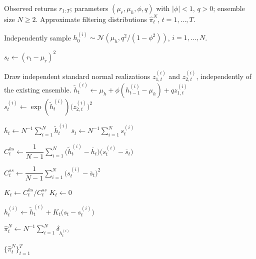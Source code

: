 \begin{algorithm}[htbp]
\caption{EnKF-Type Filtering for the SV Model Using Squared Returns}
\label{alg:sv-enkf}
\begin{algorithmic}[1]
\Require Observed returns $r_{1:T}$; parameters
$(\mu_r,\mu_h,\phi,q)$ with $|\phi|<1$, $q>0$;
ensemble size $N\geq 2$.
\Ensure Approximate filtering distributions
$\widehat{\pi}_t^N$, $t=1,\ldots,T$.

\State Independently sample
$h_0^{(i)}\sim
\mathcal{N}\!\left(\mu_h,q^2/(1-\phi^2)\right)$,
$i=1,\ldots,N$.

    \State $s_t\gets(r_t-\mu_r)^2$

        \State Draw independent standard normal realizations
        $z_{1,t}^{(i)}$ and $z_{2,t}^{(i)}$,
        independently of the existing ensemble.
        \State $\widetilde{h}_t^{(i)}
        \gets \mu_h+\phi(h_{t-1}^{(i)}-\mu_h)
        +qz_{1,t}^{(i)}$
        \State $s_t^{(i)}
        \gets \exp(\widetilde{h}_t^{(i)})
        \bigl(z_{2,t}^{(i)}\bigr)^2$
    \EndFor

    \State $\overline{h}_t
    \gets N^{-1}\sum_{i=1}^N\widetilde{h}_t^{(i)}$
    \State $\overline{s}_t
    \gets N^{-1}\sum_{i=1}^N s_t^{(i)}$

    \State $C_t^{hs}\gets
    \dfrac{1}{N-1}\sum_{i=1}^N
    \bigl(\widetilde{h}_t^{(i)}-\overline{h}_t\bigr)
    \bigl(s_t^{(i)}-\overline{s}_t\bigr)$

    \State $C_t^{ss}\gets
    \dfrac{1}{N-1}\sum_{i=1}^N
    \bigl(s_t^{(i)}-\overline{s}_t\bigr)^2$

        \State $K_t\gets C_t^{hs}/C_t^{ss}$
    \Else
        \State $K_t\gets 0$
    \EndIf

        \State $h_t^{(i)}
        \gets \widetilde{h}_t^{(i)}
        +K_t\bigl(s_t-s_t^{(i)}\bigr)$
    \EndFor

    \State $\widehat{\pi}_t^N
    \gets N^{-1}\sum_{i=1}^N\delta_{h_t^{(i)}}$
\EndFor

\State \Return $\{\widehat{\pi}_t^N\}_{t=1}^T$
\end{algorithmic}
\end{algorithm}



